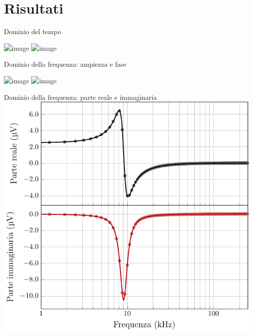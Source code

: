 \documentclass[11pt, xcolor=dvipsnames, aspectratio=43]{beamer}
\begin{document}
\section{Risultati}
\begin{frame}{Dominio del tempo}
\begin{center}
\includegraphics<1>[scale=0.9]{Plottime}
\includegraphics<2>[scale=0.9]{Plottime_arrow}
\end{center}
\end{frame}

\begin{frame}{Dominio della frequenza: ampiezza e fase}
\begin{center}
\includegraphics<1>[scale=0.9]{Plotfreqs}
\includegraphics<2>[scale=0.9]{Plot_freqs_arrow}
\end{center}
\end{frame}


\begin{frame}{Dominio della frequenza: parte reale e immaginaria}
\centering
\includegraphics[scale=0.68]{Real_Imag}
\end{frame}
\end{document}
